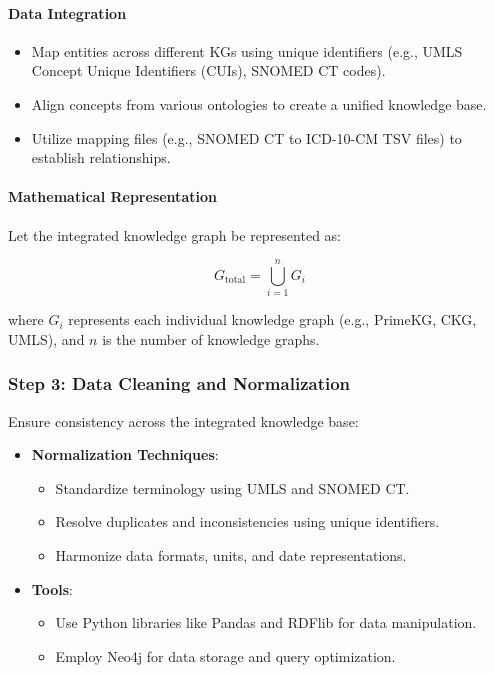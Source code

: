 \documentclass[12pt, a4paper]{article}
\begin{document}
\paragraph{Data Integration}

\begin{itemize}
    \item Map entities across different KGs using unique identifiers (e.g., UMLS Concept Unique Identifiers (CUIs), SNOMED CT codes).
    \item Align concepts from various ontologies to create a unified knowledge base.
    \item Utilize mapping files (e.g., SNOMED CT to ICD-10-CM TSV files) to establish relationships.
\end{itemize}

\paragraph{Mathematical Representation}

Let the integrated knowledge graph be represented as:

\begin{equation}
G_{\text{total}} = \bigcup_{i=1}^{n} G_i
\end{equation}

where \( G_i \) represents each individual knowledge graph (e.g., PrimeKG, CKG, UMLS), and \( n \) is the number of knowledge graphs.

\subsubsection{Step 3: Data Cleaning and Normalization}

Ensure consistency across the integrated knowledge base:

\begin{itemize}
    \item \textbf{Normalization Techniques}:
    \begin{itemize}
        \item Standardize terminology using UMLS and SNOMED CT.
        \item Resolve duplicates and inconsistencies using unique identifiers.
        \item Harmonize data formats, units, and date representations.
    \end{itemize}
    \item \textbf{Tools}:
    \begin{itemize}
        \item Use Python libraries like Pandas and RDFlib for data manipulation.
        \item Employ Neo4j for data storage and query optimization.
    \end{itemize}
\end{itemize}
\end{document}
